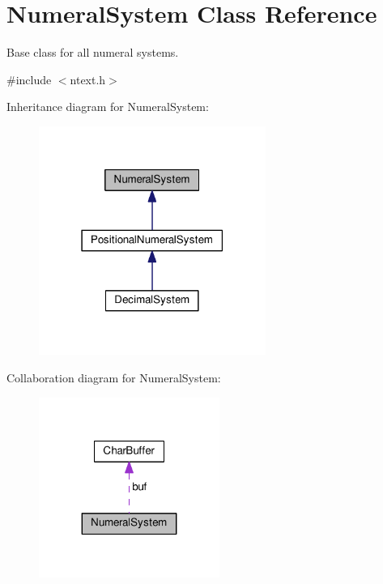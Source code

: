 \hypertarget{classNumeralSystem}{}\section{Numeral\+System Class Reference}
\label{classNumeralSystem}


Base class for all numeral systems.  




{\ttfamily \#include $<$ntext.\+h$>$}



Inheritance diagram for Numeral\+System\+:\nopagebreak
\begin{figure}[H]
\begin{center}
\leavevmode
\includegraphics[width=210pt]{classNumeralSystem__inherit__graph}
\end{center}
\end{figure}


Collaboration diagram for Numeral\+System\+:\nopagebreak
\begin{figure}[H]
\begin{center}
\leavevmode
\includegraphics[width=167pt]{classNumeralSystem__coll__graph}
\end{center}
\end{figure}
